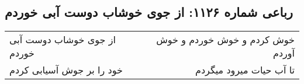 \begin{center}
\section*{رباعی شماره ۱۱۲۶: از جوی خوشاب دوست آبی خوردم}
\label{sec:1126}
\begin{longtable}{l p{0.5cm} r}
از جوی خوشاب دوست آبی خوردم
&&
خوش کردم و خوش خوردم و خوش آوردم
\\
خود را بر جوش آسیابی کردم
&&
تا آب حیات میرود میگردم
\\
\end{longtable}
\end{center}
